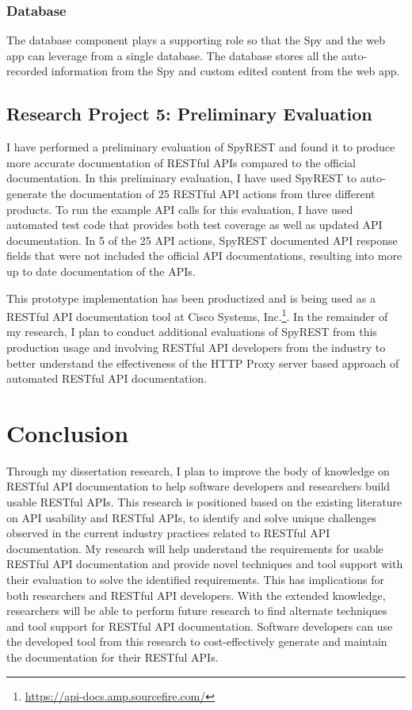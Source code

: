 \documentclass[11pt,oneside]{book}
\begin{document}
\subsection{Database}

The database component plays a supporting role so that the Spy and the web app can leverage from a single database. The database stores all the auto-recorded information from the Spy and custom edited content from the web app.

\section{Research Project 5: Preliminary Evaluation}

I have performed a preliminary evaluation of SpyREST and found it to produce more accurate documentation of RESTful APIs compared to the official documentation. In this preliminary evaluation, I have used SpyREST to auto-generate the documentation of 25 RESTful API actions from three different products. To run the example API calls for this evaluation, I have used automated test code that provides both test coverage as well as updated API documentation. In 5 of the 25 API actions, SpyREST documented API response fields that were not included the official API documentations, resulting into more up to date documentation of the APIs.

This prototype implementation has been productized and is being used as a RESTful API documentation tool at Cisco Systems, Inc.\footnote{\url{https://api-docs.amp.sourcefire.com/}}. In the remainder of my research, I plan to conduct additional evaluations of SpyREST from this production usage and involving RESTful API developers from the industry to better understand the effectiveness of the HTTP Proxy server based approach of automated RESTful API documentation.

\chapter{Conclusion}

Through my dissertation research, I plan to improve the body of knowledge on RESTful API documentation to help software developers and researchers build usable RESTful APIs. This research is positioned based on the existing literature on API usability and RESTful APIs, to identify and solve unique challenges observed in the current industry practices related to RESTful API documentation. My research will help understand the requirements for usable RESTful API documentation and provide novel techniques and tool support with their evaluation to solve the identified requirements. This has implications for both researchers and RESTful API developers. With the extended knowledge, researchers will be able to perform future research to find alternate techniques and tool support for RESTful API documentation. Software developers can use the developed tool from this research to cost-effectively generate and maintain the documentation for their RESTful APIs.
\end{document}
